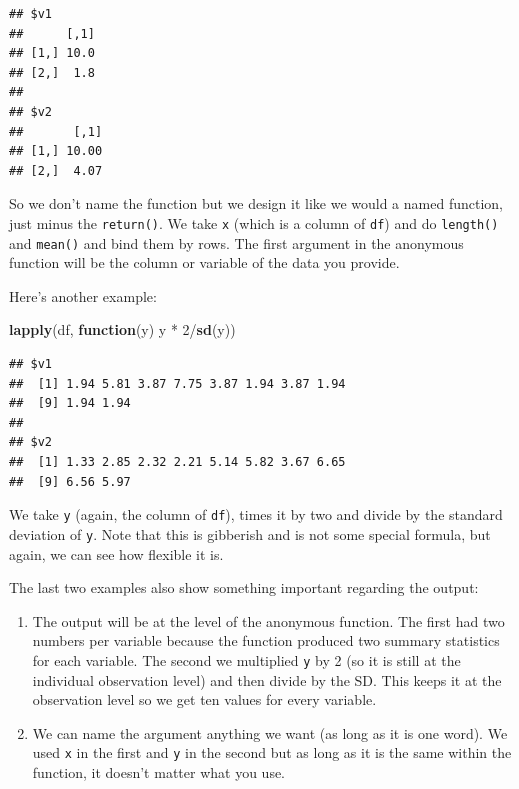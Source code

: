 \documentclass[]{tufte-book}
\newenvironment{Shaded}{}{}
\newcommand{\KeywordTok}[1]{\textcolor[rgb]{0.00,0.44,0.13}{\textbf{#1}}}
\newcommand{\DecValTok}[1]{\textcolor[rgb]{0.25,0.63,0.44}{#1}}
\newcommand{\StringTok}[1]{\textcolor[rgb]{0.25,0.44,0.63}{#1}}
\newcommand{\ControlFlowTok}[1]{\textcolor[rgb]{0.00,0.44,0.13}{\textbf{#1}}}
\newcommand{\OperatorTok}[1]{\textcolor[rgb]{0.40,0.40,0.40}{#1}}
\newcommand{\NormalTok}[1]{#1}
\providecommand{\tightlist}{%
  \setlength{\itemsep}{0pt}\setlength{\parskip}{0pt}}
\theoremstyle{definition}
\theoremstyle{definition}
\theoremstyle{remark}
\begin{document}
\begin{verbatim}
## $v1
##      [,1]
## [1,] 10.0
## [2,]  1.8
## 
## $v2
##       [,1]
## [1,] 10.00
## [2,]  4.07
\end{verbatim}

So we don't name the function but we design it like we would a named
function, just minus the \texttt{return()}. We take \texttt{x} (which is
a column of \texttt{df}) and do \texttt{length()} and \texttt{mean()}
and bind them by rows. The first argument in the anonymous function will
be the column or variable of the data you provide.

Here's another example:

\begin{Shaded}
\begin{Highlighting}[]
\KeywordTok{lapply}\NormalTok{(df, }\ControlFlowTok{function}\NormalTok{(y) y }\OperatorTok{*}\StringTok{ }\DecValTok{2}\OperatorTok{/}\KeywordTok{sd}\NormalTok{(y))}
\end{Highlighting}
\end{Shaded}

\begin{verbatim}
## $v1
##  [1] 1.94 5.81 3.87 7.75 3.87 1.94 3.87 1.94
##  [9] 1.94 1.94
## 
## $v2
##  [1] 1.33 2.85 2.32 2.21 5.14 5.82 3.67 6.65
##  [9] 6.56 5.97
\end{verbatim}

We take \texttt{y} (again, the column of \texttt{df}), times it by two
and divide by the standard deviation of \texttt{y}. Note that this is
gibberish and is not some special formula, but again, we can see how
flexible it is.

The last two examples also show something important regarding the
output:

\begin{enumerate}
\def\labelenumi{\arabic{enumi}.}
\tightlist
\item
  The output will be at the level of the anonymous function. The first
  had two numbers per variable because the function produced two summary
  statistics for each variable. The second we multiplied \texttt{y} by 2
  (so it is still at the individual observation level) and then divide
  by the SD. This keeps it at the observation level so we get ten values
  for every variable.
\item
  We can name the argument anything we want (as long as it is one word).
  We used \texttt{x} in the first and \texttt{y} in the second but as
  long as it is the same within the function, it doesn't matter what you
  use.
\end{enumerate}
\end{document}
